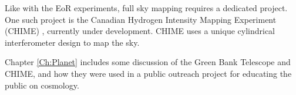 Like with the EoR experiments, full sky mapping requires a dedicated project. One such project is the Canadian Hydrogen Intensity Mapping Experiment (CHIME) \cite{shaw_2014}\cite{chime}, currently under development. CHIME uses a unique cylindrical interferometer design to map the sky. 

Chapter \ref{Ch:Planet} includes some discussion of the Green Bank Telescope and CHIME, and how they were used in a public outreach project for educating the public on \cm cosmology. 

